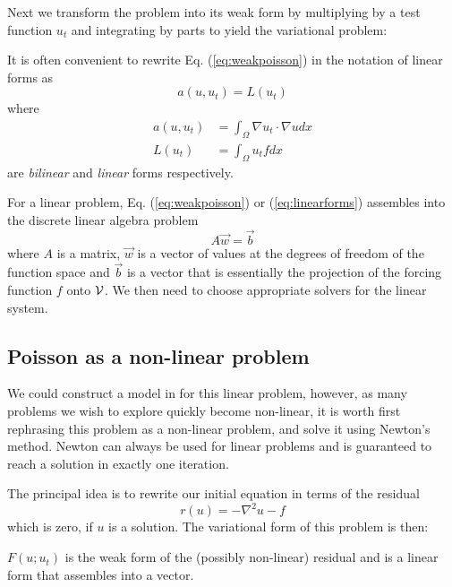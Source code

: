 Next we transform the problem into its weak form by multiplying by a
test function $u_{t}$ and integrating by parts to yield the
variational problem: 
\begin{quote}
\end{quote}
It is often convenient to rewrite Eq. (\ref{eq:weakpoisson}) in the
notation of linear forms as
\begin{equation}
\label{eq:linearforms}
  a(u,u_{t}) = L(u_{t})
\end{equation}
where
\begin{align}
  \label{eq:5}
  a(u,u_{t}) &= \int_\Omega \nabla u_t\cdot \nabla u dx\\
  L(u_{t})    &=  \int_\Omega u_t f dx
\end{align}
are \emph{bilinear} and \emph{linear} forms respectively.

For a linear problem, Eq. (\ref{eq:weakpoisson}) or (\ref{eq:linearforms})
assembles into the discrete linear algebra problem
\begin{equation}
  \label{eq:1}
  A\vec{w} = \vec{b}
\end{equation}
where $A$ is a matrix, $\vec{w}$ is a vector of values at the degrees
of freedom of the function space and $\vec{b}$ is a vector that is essentially the
projection of the forcing function $f$ onto $\mathcal{V}$.  We then need
to choose appropriate solvers for the linear system.

\subsection{Poisson as a non-linear problem}
\label{sec:poisson-as-non}

We could construct a model in \TF{} for this linear problem, however, as many
problems we wish to explore  quickly become non-linear, it is worth
first rephrasing this problem as a non-linear problem, and solve it
using Newton's method.  Newton can always be used for linear problems
and is guaranteed to reach a solution in exactly one iteration. %

The principal idea is to rewrite our initial equation in terms of the residual
\begin{equation}
  \label{eq:2}
  r(u) = -\nabla^2 u - f
\end{equation}
which is zero, if $u$ is a solution.  The variational form of this
problem  is then:
\begin{quote}
\end{quote} 
$F(u;u_{t})$ is the weak form of the (possibly non-linear) residual
and is a linear form that assembles into a vector.

